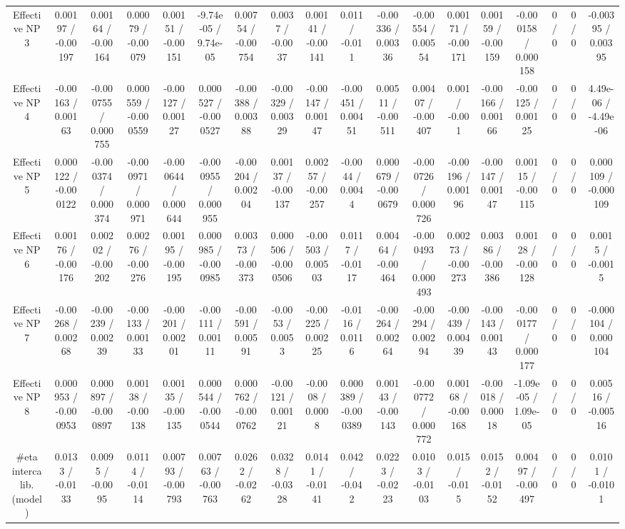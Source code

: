 \documentclass[10pt]{article}
\begin{document}
\begin{table}[htbp]
\begin{center}
\begin{tabular}{|c|c|c|c|c|c|c|c|c|c|c|c|c|c|c|c|c|c|}
  Effective NP 3 & 0.00197 / -0.00197 & 0.00164 / -0.00164 & 0.00079 / -0.00079 & 0.00151 / -0.00151 & -9.74e-05 / 9.74e-05 & 0.00754 / -0.00754 & 0.0037 / -0.0037 & 0.00141 / -0.00141 & 0.011 / -0.011 & -0.00336 / 0.00336 & -0.00554 / 0.00554 & 0.00171 / -0.00171 & 0.00159 / -0.00159 & -0.000158 / 0.000158 & 0 / 0 & 0 / 0 & -0.00395 / 0.00395 \\ 
  Effective NP 4 & -0.00163 / 0.00163 & -0.000755 / 0.000755 & 0.000559 / -0.000559 & -0.00127 / 0.00127 & 0.000527 / -0.000527 & -0.00388 / 0.00388 & -0.00329 / 0.00329 & -0.00147 / 0.00147 & -0.00451 / 0.00451 & 0.00511 / -0.00511 & 0.00407 / -0.00407 & 0.001 / -0.001 & -0.00166 / 0.00166 & -0.00125 / 0.00125 & 0 / 0 & 0 / 0 & 4.49e-06 / -4.49e-06 \\ 
  Effective NP 5 & 0.000122 / -0.000122 & -0.000374 / 0.000374 & -0.000971 / 0.000971 & -0.000644 / 0.000644 & -0.000955 / 0.000955 & -0.00204 / 0.00204 & 0.00137 / -0.00137 & 0.00257 / -0.00257 & -0.0044 / 0.0044 & 0.000679 / -0.000679 & -0.000726 / 0.000726 & -0.00196 / 0.00196 & -0.00147 / 0.00147 & 0.00115 / -0.00115 & 0 / 0 & 0 / 0 & 0.000109 / -0.000109 \\ 
  Effective NP 6 & 0.00176 / -0.00176 & 0.00202 / -0.00202 & 0.00276 / -0.00276 & 0.00195 / -0.00195 & 0.000985 / -0.000985 & 0.00373 / -0.00373 & 0.000506 / -0.000506 & -0.00503 / 0.00503 & 0.0117 / -0.0117 & 0.00464 / -0.00464 & -0.000493 / 0.000493 & 0.00273 / -0.00273 & 0.00386 / -0.00386 & 0.00128 / -0.00128 & 0 / 0 & 0 / 0 & 0.0015 / -0.0015 \\ 
  Effective NP 7 & -0.00268 / 0.00268 & -0.00239 / 0.00239 & -0.00133 / 0.00133 & -0.00201 / 0.00201 & -0.00111 / 0.00111 & -0.00591 / 0.00591 & -0.0053 / 0.0053 & -0.00225 / 0.00225 & -0.0116 / 0.0116 & -0.00264 / 0.00264 & -0.00294 / 0.00294 & -0.00439 / 0.00439 & -0.00143 / 0.00143 & -0.000177 / 0.000177 & 0 / 0 & 0 / 0 & -0.000104 / 0.000104 \\ 
  Effective NP 8 & 0.000953 / -0.000953 & 0.000897 / -0.000897 & 0.00138 / -0.00138 & 0.00135 / -0.00135 & 0.000544 / -0.000544 & 0.000762 / -0.000762 & -0.00121 / 0.00121 & -0.0008 / 0.0008 & 0.000389 / -0.000389 & 0.00143 / -0.00143 & -0.000772 / 0.000772 & 0.00168 / -0.00168 & -0.00018 / 0.00018 & -1.09e-05 / 1.09e-05 & 0 / 0 & 0 / 0 & 0.00516 / -0.00516 \\ 
  #eta intercalib. (model) & 0.0133 / -0.0133 & 0.0095 / -0.0095 & 0.0114 / -0.0114 & 0.00793 / -0.00793 & 0.00763 / -0.00763 & 0.0262 / -0.0262 & 0.0328 / -0.0328 & 0.0141 / -0.0141 & 0.042 / -0.042 & 0.0223 / -0.0223 & 0.0103 / -0.0103 & 0.015 / -0.015 & 0.0152 / -0.0152 & 0.00497 / -0.00497 & 0 / 0 & 0 / 0 & 0.0101 / -0.0101 \\ 

\end{tabular}
\end{center}
\end{table}
\end{document}
